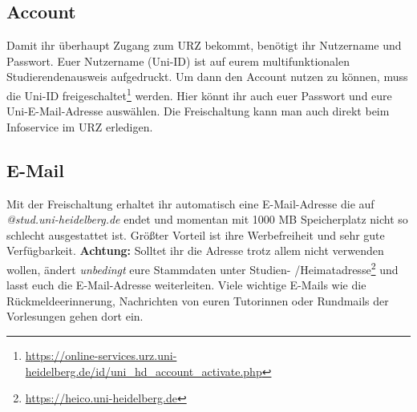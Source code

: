 \subsection{Account}
Damit ihr überhaupt Zugang zum URZ bekommt, benötigt ihr Nutzername und Passwort. Euer Nutzername (Uni-ID) ist auf eurem multifunktionalen Studierendenausweis aufgedruckt. Um dann den Account nutzen zu können, muss die Uni-ID freigeschaltet\footnote{\url{https://online-services.urz.uni-heidelberg.de/id/uni_hd_account_activate.php}} werden. Hier könnt ihr auch euer Passwort und eure Uni-E-Mail-Adresse auswählen. Die Freischaltung kann man auch direkt beim Infoservice im URZ erledigen.

\vspace*{-2mm}
\subsection{E-Mail}
\vspace*{-1mm}
Mit der Freischaltung erhaltet ihr automatisch eine E-Mail-Adresse die auf \emph{@stud.uni-heidelberg.de} endet und momentan mit 1000 MB Speicherplatz nicht so schlecht ausgestattet ist. Größter Vorteil ist ihre Werbefreiheit und sehr gute Verfügbarkeit. \textbf{Achtung:} Solltet ihr die Adresse trotz allem nicht verwenden wollen, ändert \emph{unbedingt} eure Stammdaten unter Studien- /Heimatadresse\footnote{\url{https://heico.uni-heidelberg.de}} und lasst euch die E-Mail-Adresse weiterleiten. Viele wichtige E-Mails wie die Rückmeldeerinnerung, Nachrichten von euren Tutorinnen oder Rundmails der Vorlesungen gehen dort ein.


